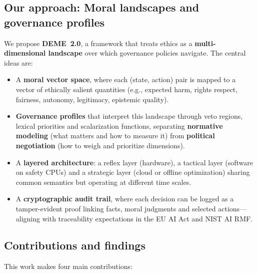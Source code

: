 \documentclass[11pt]{article}
\begin{document}
\subsection{Our approach: Moral landscapes and governance profiles}

We propose \textbf{DEME~2.0}, a framework that treats ethics as a \textbf{multi-dimensional landscape} over which governance policies navigate. The central ideas are:

\begin{itemize}
  \item A \textbf{moral vector space}, where each (state, action) pair is mapped to a vector of ethically salient quantities (e.g., expected harm, rights respect, fairness, autonomy, legitimacy, epistemic quality).
  \item \textbf{Governance profiles} that interpret this landscape through veto regions, lexical priorities and scalarization functions, separating \textbf{normative modeling} (what matters and how to measure it) from \textbf{political negotiation} (how to weigh and prioritize dimensions).
  \item A \textbf{layered architecture}: a reflex layer (hardware), a tactical layer (software on safety CPUs) and a strategic layer (cloud or offline optimization) sharing common semantics but operating at different time scales.
  \item A \textbf{cryptographic audit trail}, where each decision can be logged as a tamper-evident proof linking facts, moral judgments and selected actions---aligning with traceability expectations in the EU AI Act and NIST AI RMF.
\end{itemize}

\subsection{Contributions and findings}

This work makes four main contributions:
\end{document}
